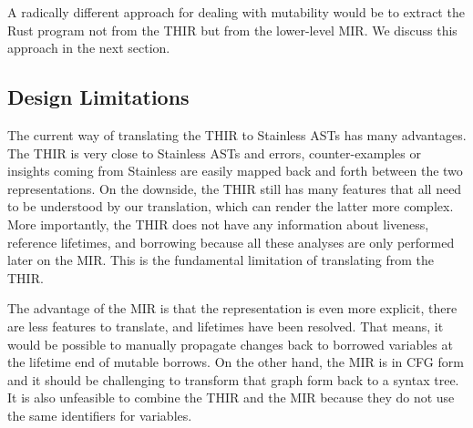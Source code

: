 A radically different approach for dealing with mutability would be to
extract the Rust program not from the THIR but from the lower-level MIR.
We discuss this approach in the next section.

\subsection{Design Limitations}

The current way of translating the THIR to Stainless ASTs has many
advantages. The THIR is very close to Stainless ASTs and errors,
counter-examples or insights coming from Stainless are easily mapped
back and forth between the two representations. On the downside, the
THIR still has many features that all need to be understood by our
translation, which can render the latter more complex. More importantly,
the THIR does not have any information about liveness, reference
lifetimes, and borrowing because all these analyses are only performed
later on the MIR. This is the fundamental limitation of translating from
the THIR.

The advantage of the MIR is that the representation is even more
explicit, there are less features to translate, and lifetimes have been
resolved. That means, it would be possible to manually propagate changes
back to borrowed variables at the lifetime end of mutable borrows. On
the other hand, the MIR is in CFG form and it should be challenging to
transform that graph form back to a syntax tree. It is also unfeasible
to combine the THIR and the MIR because they do not use the same
identifiers for variables.
